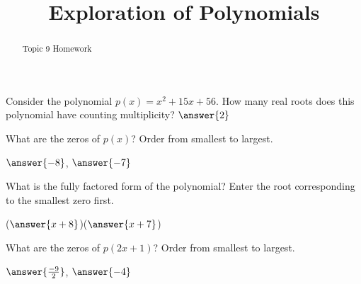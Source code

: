 \documentclass{ximera}
\title{Exploration of Polynomials}
\begin{document}
\begin{abstract}
Topic 9 Homework
\end{abstract}
\maketitle

%





\begin{problem}
    Consider the polynomial $p(x) =  x^2 + 15 x + 56$.
    How many real roots does this polynomial have counting multiplicity? $\answer{2}$
    \begin{problem}
        What are the zeros of $p(x)$? Order from smallest to largest.

        $\answer{-8}$, $\answer{-7}$
        \begin{problem}
            What is the fully factored form of the polynomial? Enter the root corresponding to the smallest zero first.

            ($\answer{x+8}$)($\answer{x+7}$)
        \end{problem}

        \begin{problem}
            What are the zeros of $p(2x+1)$? Order from smallest to largest.

            $\answer{\frac{-9}{2}}$, $\answer{-4}$
        \end{problem}
    \end{problem}
\end{problem}
\end{document}
